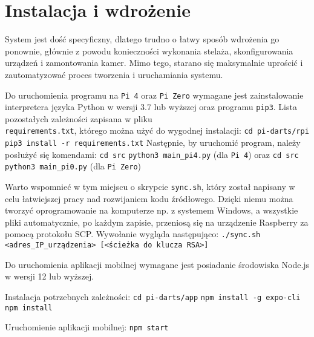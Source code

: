 \chapter{Instalacja i wdrożenie}
\label{installation}
\thispagestyle{chapterBeginStyle}

System jest dość specyficzny, dlatego trudno o łatwy sposób wdrożenia go ponownie, głównie z powodu konieczności wykonania stelaża, skonfigurowania urządzeń i zamontowania kamer. Mimo tego, starano się maksymalnie uprościć i zautomatyzować proces tworzenia i uruchamiania systemu.

Do uruchomienia programu na \verb|Pi 4| oraz \verb|Pi Zero| wymagane jest zainstalowanie interpretera języka Python w wersji 3.7 lub wyższej oraz programu \verb|pip3|. Lista pozostałych zależności zapisana w pliku \\ \verb|requirements.txt|, którego można użyć do wygodnej instalacji:
\newline \newline
\indent \verb|cd pi-darts/rpi| \newline
\indent \verb|pip3 install -r requirements.txt|
\newline \newline
\noindent Następnie, by uruchomić program, należy posłużyć się komendami: \newline \newline
\indent \verb|cd src| \newline
\indent \verb|python3 main_pi4.py| (dla \verb|Pi 4|) \newline\newline oraz \indent \newline \newline \indent \verb|cd src| \newline \indent \verb|python3 main_pi0.py| (dla \verb|Pi Zero|) \newline

Warto wspomnieć w tym miejscu o skrypcie \verb|sync.sh|, który został napisany w celu łatwiejszej pracy nad rozwijaniem kodu źródłowego. Dzięki niemu można tworzyć oprogramowanie na komputerze np. z systemem Windows, a wszystkie pliki automatycznie, po każdym zapisie, przeniosą się na urządzenie Raspberry za pomocą protokołu SCP. Wywołanie wygląda następująco:
\newline \newline
\indent \verb|./sync.sh <adres_IP_urządzenia> [<ścieżka do klucza RSA>]|
\newline

Do uruchomienia aplikacji mobilnej wymagane jest posiadanie środowiska Node.js w wersji 12 lub wyższej. 

\noindent Instalacja potrzebnych zależności:
\newline \newline
\indent \verb|cd pi-darts/app| \newline
\indent \verb|npm install -g expo-cli| \newline
\indent \verb|npm install| \newline

\noindent Uruchomienie aplikacji mobilnej:
\newline \newline
\indent \verb|npm start| 

